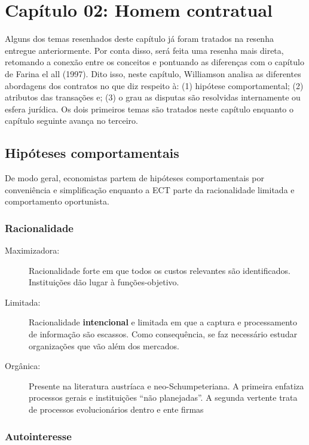 \section*{Capítulo 02: Homem contratual}

Alguns dos temas resenhados deste capítulo já foram tratados na resenha entregue anteriormente. Por conta disso, será feita uma resenha mais direta, retomando a conexão entre os conceitos e pontuando as diferenças com o capítulo de Farina el all (1997). Dito isso, neste capítulo, Williamson analisa as diferentes abordagens dos contratos no que diz respeito à: (1) hipótese comportamental; (2) atributos das transações e; (3) o grau as disputas são resolvidas internamente ou esfera jurídica. Os dois primeiros temas são tratados neste capítulo enquanto o capítulo seguinte avança no terceiro.

\subsection*{Hipóteses comportamentais}

De modo geral, economistas partem de hipóteses comportamentais por conveniência e simplificação enquanto a ECT parte da racionalidade limitada e comportamento oportunista.

\subsubsection*{Racionalidade}

\begin{description}
	\item[Maximizadora:] Racionalidade forte em que todos os custos relevantes são identificados. Instituições dão lugar à funções-objetivo.
	\item[Limitada:] Racionalidade \textbf{intencional} e limitada em que a captura e processamento de informação são escassos. Como consequência, se faz necessário estudar organizações que vão além dos mercados.
	\item[Orgânica:] Presente na literatura austríaca e neo-Schumpeteriana. A primeira enfatiza processos gerais e instituições ``não planejadas''. A segunda vertente trata de processos evolucionários dentro e ente firmas
\end{description}


\subsubsection*{Autointeresse}


